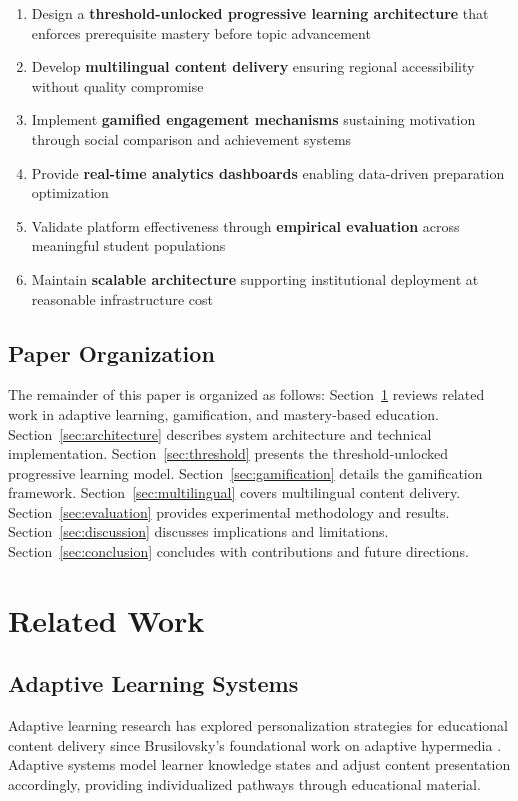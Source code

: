 \documentclass[journal]{IEEEtran}
\begin{document}
\begin{enumerate}
    \item Design a \textbf{threshold-unlocked progressive learning architecture} that enforces prerequisite mastery before topic advancement
    \item Develop \textbf{multilingual content delivery} ensuring regional accessibility without quality compromise
    \item Implement \textbf{gamified engagement mechanisms} sustaining motivation through social comparison and achievement systems
    \item Provide \textbf{real-time analytics dashboards} enabling data-driven preparation optimization
    \item Validate platform effectiveness through \textbf{empirical evaluation} across meaningful student populations
    \item Maintain \textbf{scalable architecture} supporting institutional deployment at reasonable infrastructure cost
\end{enumerate}

\subsection{Paper Organization}

The remainder of this paper is organized as follows: Section~\ref{sec:related} reviews related work in adaptive learning, gamification, and mastery-based education. Section~\ref{sec:architecture} describes system architecture and technical implementation. Section~\ref{sec:threshold} presents the threshold-unlocked progressive learning model. Section~\ref{sec:gamification} details the gamification framework. Section~\ref{sec:multilingual} covers multilingual content delivery. Section~\ref{sec:evaluation} provides experimental methodology and results. Section~\ref{sec:discussion} discusses implications and limitations. Section~\ref{sec:conclusion} concludes with contributions and future directions.

\section{Related Work}
\label{sec:related}

\subsection{Adaptive Learning Systems}

Adaptive learning research has explored personalization strategies for educational content delivery since Brusilovsky's foundational work on adaptive hypermedia \cite{brusilovsky2001}. Adaptive systems model learner knowledge states and adjust content presentation accordingly, providing individualized pathways through educational material.
\end{document}
